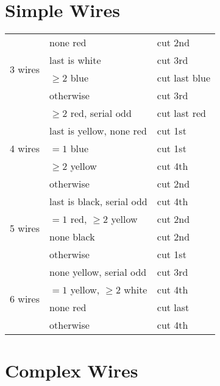 \documentclass[11pt]{amsart}
\begin{document}
\section{Simple Wires}

\begin{tabular}{|l|l|l|}
\hline
\multirow{4}{*}{3 wires} & none red                    & cut 2nd \\
                         & last is white               & cut 3rd \\
                         & $\ge 2$ blue                & cut last blue \\
                         & otherwise                   & cut 3rd \\
\hline
\multirow{5}{*}{4 wires} & $\ge 2$ red, serial odd     & cut last red \\
                         & last is yellow, none red    & cut 1st \\
                         & $= 1$ blue                  & cut 1st \\
                         & $\ge 2$ yellow              & cut 4th \\
                         & otherwise                   & cut 2nd \\
\hline
\multirow{4}{*}{5 wires} & last is black, serial odd   & cut 4th \\
                         & $= 1$ red, $\ge 2$ yellow   & cut 2nd \\
                         & none black                  & cut 2nd \\
                         & otherwise                   & cut 1st \\
\hline
\multirow{4}{*}{6 wires} & none yellow, serial odd     & cut 3rd \\
                         & $= 1$ yellow, $\ge 2$ white & cut 4th \\
                         & none red                    & cut last \\
                         & otherwise                   & cut 4th \\
\hline
\end{tabular}



\section{Complex Wires}
\end{document}
